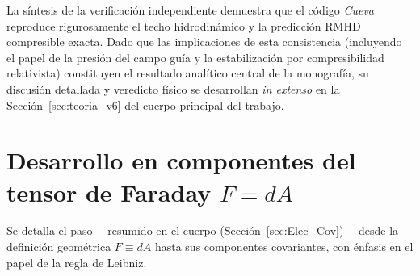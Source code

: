 \primerparrafo La síntesis de la verificación independiente demuestra que el código \textit{Cueva} reproduce rigurosamente el techo hidrodinámico y la predicción RMHD compresible exacta. Dado que las implicaciones de esta consistencia (incluyendo el papel de la presión del campo guía y la estabilización por compresibilidad relativista) constituyen el resultado analítico central de la monografía, su discusión detallada y veredicto físico se desarrollan \emph{in extenso} en la Sección~\ref{sec:teoria_v6} del cuerpo principal del trabajo.


\section{Desarrollo en componentes del tensor de Faraday \texorpdfstring{$F=dA$}{F=dA}}
\label{ap:FdA}

\primerparrafo Se detalla el paso ---resumido en el cuerpo (Sección~\ref{sec:Elec_Cov})--- desde la definición geométrica $F\equiv dA$ hasta sus componentes covariantes, con énfasis en el papel de la regla de Leibniz.

